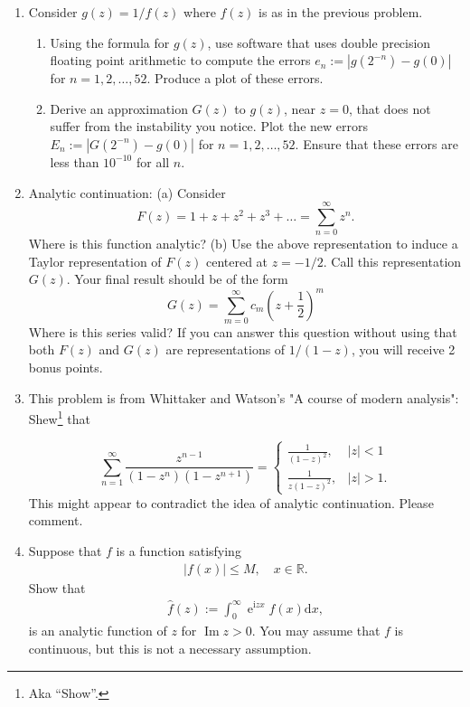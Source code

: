 \documentclass[10pt]{amsart}
\newcommand{\D}{\mathrm{d}}
\newcommand{\I}{\mathrm{i}}
\DeclareMathOperator{\E}{e}
\DeclareMathOperator{\imag}{Im}
\theoremstyle{nonumberplain}
\begin{document}
\begin{enumerate}[label={\bf {\arabic*}:}]
\item Consider $g(z) = 1/f(z)$ where $f(z)$ is as in the previous
  problem.
  \begin{enumerate}
  \item Using the formula for $g(z)$, use software that uses double
    precision floating point arithmetic to compute the errors $e_n:=
    |g(2^{-n}) - g(0)|$ for $n= 1,2,\ldots, 52$.  Produce a plot of
    these errors.
  \item Derive an approximation $G(z)$ to $g(z)$, near $z = 0$, that does not suffer
    from the instability you notice.  Plot the new errors $E_n:=
    |G(2^{-n}) - g(0)|$ for $n= 1,2,\ldots, 52$.  Ensure that these
    errors are less than $10^{-10}$ for all $n$.\\
\end{enumerate}
\newpage

\item Analytic continuation:
(a) Consider
$$
F(z)=1+z+z^2+z^3+\ldots=\sum_{n=0}^{\infty} z^n .
$$
Where is this function analytic?
(b) Use the above representation to induce a Taylor representation of $F(z)$ centered at $z=-1 / 2$. Call this representation $G(z)$. Your final result should be of the form
$$
G(z)=\sum_{m=0}^{\infty} c_m\left(z+\frac{1}{2}\right)^m
$$
Where is this series valid? If you can answer this question without
using that both $F(z)$ and $G(z)$ are representations of $1 /(1-z)$,
you will receive 2 bonus points.\\
\newpage

\item This problem is from Whittaker and Watson's "A course of modern
  analysis": Shew\footnote{Aka ``Show''.} that

$$
\sum_{n=1}^{\infty} \frac{z^{n-1}}{\left(1-z^n\right)\left(1-z^{n+1}\right)}= \begin{cases}\frac{1}{(1-z)^2}, & |z|<1 \\ \frac{1}{z(1-z)^2}, & |z|>1 .\end{cases}
$$
This might appear to contradict the idea of analytic
continuation. Please comment.\\
\newpage

\item Suppose that $f$ is a function satisfying
  \begin{align*}
    |f(x)| \leq M, \quad x \in \mathbb R.
  \end{align*}
  Show that
  \begin{align*}
    \hat f(z) := \int_0^\infty \E^{\I z x} f(x) \D x,
  \end{align*}
  is an analytic function of $z$ for $\imag z > 0$.  You may assume
  that $f$ is continuous, but this is not a necessary assumption.\\
\newpage


\end{enumerate}
\end{document}
